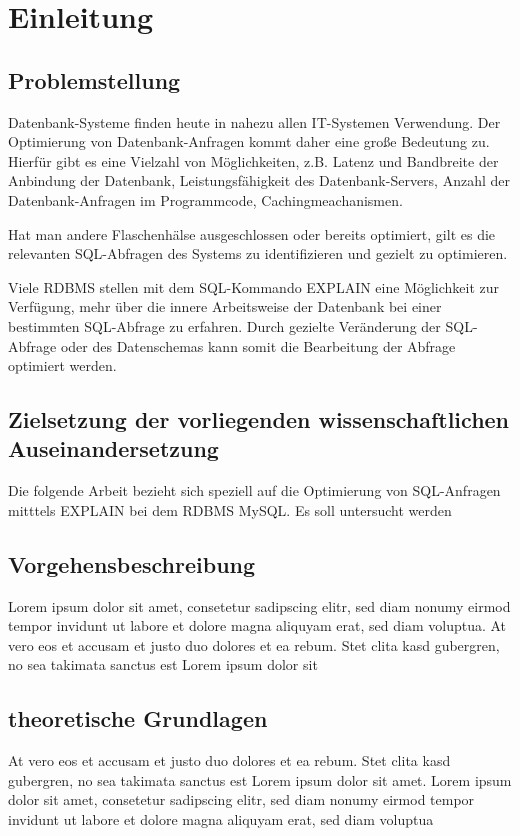 \chapter{Einleitung}
\section{Problemstellung}
Datenbank-Systeme finden heute in nahezu allen IT-Systemen Verwendung.
Der Optimierung von Datenbank-Anfragen kommt daher eine große Bedeutung zu.
Hierfür gibt es eine Vielzahl von Möglichkeiten, z.B. Latenz und Bandbreite der Anbindung der Datenbank, Leistungsfähigkeit des Datenbank-Servers, Anzahl der Datenbank-Anfragen im Programmcode, Cachingmeachanismen.

Hat man andere Flaschenhälse ausgeschlossen oder bereits optimiert,  gilt es die relevanten SQL-Abfragen des Systems zu identifizieren und gezielt zu optimieren.

Viele RDBMS stellen mit dem SQL-Kommando EXPLAIN eine Möglichkeit zur Verfügung, mehr über die innere Arbeitsweise der Datenbank bei einer bestimmten SQL-Abfrage zu erfahren.
Durch gezielte Veränderung der SQL-Abfrage oder des Datenschemas kann somit die Bearbeitung der Abfrage optimiert werden.

\section{Zielsetzung der vorliegenden  wissenschaftlichen  Auseinandersetzung}
Die folgende Arbeit bezieht sich speziell auf die Optimierung von SQL-Anfragen mitttels EXPLAIN bei dem RDBMS MySQL.
Es soll untersucht werden 

\section{Vorgehensbeschreibung}
Lorem ipsum dolor sit amet, consetetur sadipscing elitr,
  sed diam nonumy eirmod tempor invidunt ut labore et dolore
  magna aliquyam erat, sed diam voluptua. At vero eos et
  accusam et justo duo dolores et ea rebum. Stet clita kasd
  gubergren, no sea takimata sanctus est Lorem ipsum dolor sit
\section{theoretische Grundlagen}
 At vero eos et
  accusam et justo duo dolores et ea rebum. Stet clita kasd
  gubergren, no sea takimata sanctus est Lorem ipsum dolor sit
  amet. Lorem ipsum dolor sit amet, consetetur sadipscing elitr,
  sed diam nonumy eirmod tempor invidunt ut labore et dolore
  magna aliquyam erat, sed diam voluptua

